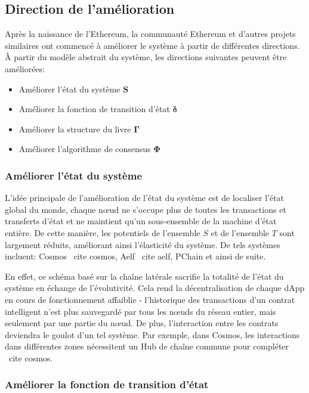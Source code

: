 \documentclass[UTF8,nofonts]{article}
\begin{document}
\begin{multicols}{2}
\subsection{Direction de l'amélioration}
Après la naissance de l'Ethereum, la communauté Ethereum et d'autres projets similaires ont commencé à améliorer le système à partir de différentes directions. À partir du modèle abstrait du système, les directions suivantes peuvent être améliorées:
\begin{itemize}
	\item Améliorer l'état du système  $\boldsymbol{S}$	
	\item Améliorer la fonction de transition d'état  $\boldsymbol{\delta}$	
	\item Améliorer la structure du livre $\boldsymbol{\Gamma}$
	\item Améliorer l'algorithme de consensus $\boldsymbol{\Phi}$
\end{itemize}

\subsubsection{Améliorer l'état du système}
L'idée principale de l'amélioration de l'état du système est de localiser l'état global du monde, chaque nœud ne s'occupe plus de toutes les transactions et transferts d'état et ne maintient qu'un sous-ensemble de la machine d'état entière. De cette manière, les potentiels de l'ensemble $ S $ et de l'ensemble $ T $ sont largement réduits, améliorant ainsi l'élasticité du système. De tels systèmes incluent: Cosmos \ cite {cosmos}, Aelf \ cite {aelf}, PChain et ainsi de suite.


En effet, ce schéma basé sur la chaîne latérale sacrifie la totalité de l'état du système en échange de l'évolutivité. Cela rend la décentralisation de chaque dApp en cours de fonctionnement affaiblie - l'historique des transactions d'un contrat intelligent n'est plus sauvegardé par tous les nœuds du réseau entier, mais seulement par une partie du nœud. De plus, l'interaction entre les contrats deviendra
le goulot d'un tel système. Par exemple, dans Cosmos, les interactions dans différentes zones nécessitent un Hub de chaîne commune pour compléter \ cite {cosmos}.

\subsubsection{Améliorer la fonction de transition d'état}


\end{multicols}
\end{document}
